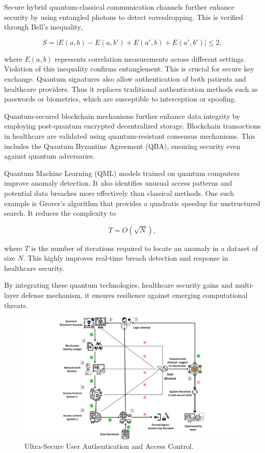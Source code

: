 \documentclass[pdflatex,sn-mathphys-num]{sn-jnl}%
\theoremstyle{thmstyleone}%
\theoremstyle{thmstyletwo}%
\theoremstyle{thmstylethree}%
\begin{document}
Secure hybrid quantum-classical communication channels further enhance security by using entangled photons to detect eavesdropping. This is verified through Bell’s inequality,  

\begin{equation}  
S = |E(a, b) - E(a, b') + E(a', b) + E(a', b')| \leq 2,  
\end{equation}  

where \( E(a, b) \) represents correlation measurements across different settings. Violation of this inequality confirms entanglement. This is crucial for secure key exchange. Quantum signatures also allow authentication of both patients and healthcare providers. Thus it replaces traditional authentication methods such as passwords or biometrics, which are susceptible to interception or spoofing.  

Quantum-secured blockchain mechanisms further enhance data integrity by employing post-quantum encrypted decentralized storage. Blockchain transactions in healthcare are validated using quantum-resistant consensus mechanisms. This includes the Quantum Byzantine Agreement (QBA), ensuring security even against quantum adversaries.  

Quantum Machine Learning (QML)\cite{bib13} models trained on quantum computers improve anomaly detection. It also identifies unusual access patterns and potential data breaches more effectively than classical methods. One such example is Grover’s algorithm that provides a quadratic speedup for unstructured search. It reduces the complexity to  

\begin{equation}  
T = O(\sqrt{N}),  
\end{equation}  

where \( T \) is the number of iterations required to locate an anomaly in a dataset of size \( N \). This highly improves real-time breach detection and response in healthcare security.  

By integrating these quantum technologies, healthcare security gains and multi-layer defense mechanism, it ensures resilience against emerging computational threats.  


\begin{figure}[t]
\centering
\includegraphics[width=13cm]{User Authenticationing.png}
\centering
\caption{Ultra-Secure User Authentication and Access Control.}
  \label{fig:User_Authentication}
\end{figure}
\end{document}
